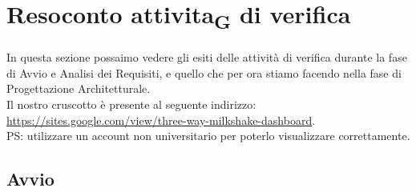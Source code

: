 
\section{Resoconto attivita\textsubscript{G} di verifica}
In questa sezione possaimo vedere gli esiti delle attività di verifica durante la fase di Avvio e Analisi dei Requisiti, e quello che per ora stiamo facendo nella fase di Progettazione Architetturale.\\
Il nostro cruscotto è presente al seguente indirizzo:\\ \url{https://sites.google.com/view/three-way-milkshake-dashboard}.\\PS: utilizzare un account non universitario per poterlo visualizzare correttamente.
\subsection{Avvio}
